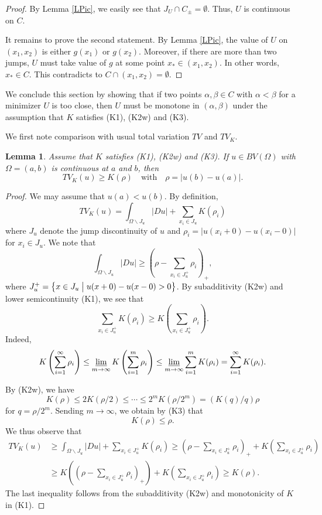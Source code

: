 \documentclass[11pt]{amsart} %
\numberwithin{equation}{section}
\newtheorem{lem}[thm]{Lemma}
\begin{document}
%
\begin{proof}
By Lemma \ref{LPic}, we easily see that $J_U \cap C_\pm=\emptyset$. %
 Thus, $U$ is continuous on $C$.

It remains to prove the second statement.
 By Lemma \ref{LPic}, the value of $U$ on $(x_1,x_2)$ is either $g(x_1)$ or $g(x_2)$.
 Moreover, if there are more than two jumps, $U$ must take value of $g$ at some point $x_*\in(x_1,x_2)$.
 In other words, $x_*\in C$.
 This contradicts to $C\cap(x_1,x_2)=\emptyset$.
\end{proof}
We conclude this section by showing that if two points $\alpha,\beta\in C$ with $\alpha<\beta$ for a minimizer $U$ is too close, then $U$ must be monotone in $(\alpha,\beta)$ under the assumption that $K$ satisfies (K1), (K2w) and (K3).

We first note comparison with usual total variation $TV$ and $TV_K$.
\begin{lem} \label{LCpTK}
Assume that $K$ satisfies (K1), (K2w) and (K3).
 If $u\in BV(\Omega)$ with $\Omega=(a,b)$ is continuous at $a$ and $b$, then
\[
	TV_K(u) \geq K(\rho) \quad\text{with}\quad
	\rho = \left\lvert u(b)-u(a) \right\rvert.
\]
\end{lem}
%
\begin{proof}
We may assume that $u(a)<u(b)$.
 By definition,
\[
	TV_K(u) = \int_{\Omega\backslash J_u} |Du|
	+ \sum_{x_i\in J_u} K(\rho_i)
\]
where $J_u$ denote the jump discontinuity of $u$ and $\rho_i=\left\lvert u(x_i+0)-u(x_i-0)\right\rvert$ for $x_i\in J_u$.
 We note that
\[
	\int_{\Omega\backslash J_u} |Du|
	\geq \left( \rho - \sum_{x_i\in J_u^+} \rho_i \right)_+,
\]
where $J_u^+=\left\{x\in J_u\bigm|u(x+0)-u(x-0)>0\right\}$.
 By subadditivity (K2w) and lower semicontinuity (K1), we see that
\[
	\sum_{x_i\in J_u^+} K(\rho_i)
	\geq K \left( \sum_{x_i\in J_u^+} \rho_i \right).
\]
Indeed,
\[
	K \left( \sum_{i=1}^\infty \rho_i \right)
	\le \varliminf_{m\to\infty} K \left( \sum_{i=1}^m \rho_i \right)
	\le \varliminf_{m\to\infty} \sum_{i=1}^m K (\rho_i) = \sum_{i=1}^\infty K(\rho_i).
\]

By (K2w), we have
\[
	K(\rho) \leq 2K(\rho/2) \leq \cdots
	\leq 2^m K(\rho/2^m) = \left(K(q)/q\right)\rho
\]
for $q=\rho/2^m$.
 Sending $m\to\infty$, we obtain by (K3) that
\[
	K(\rho) \leq \rho.
\]
We thus observe that
\begin{align*}
	TV_K(u) &\geq \int_{\Omega\backslash J_u} |Du|
	+ \sum_{x_i\in J_u^+} K(\rho_i)
	\geq \left( \rho - \sum_{x_i\in J_u^+} \rho_i \right)_+
	+ K \left( \sum_{x_i\in J_u^+} \rho_i \right) \\
	&\geq K \left(\left( \rho - \sum_{x_i\in J_u^+} \rho_i \right)_+\right) + K \left( \sum_{x_i\in J_u^+} \rho_i \right) \geq K(\rho).
\end{align*}
The last inequality follows from the subadditivity (K2w) and monotonicity of $K$ in (K1). 
\end{proof}
\end{document}
